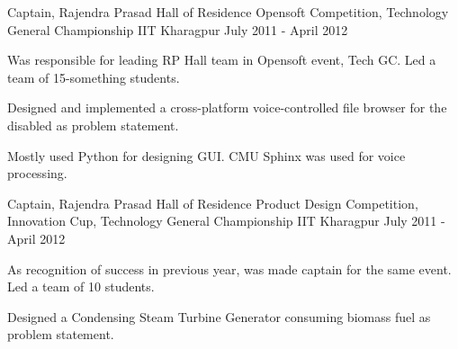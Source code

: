 \begin{cventries}
  \cventry
    {Captain, Rajendra Prasad Hall of Residence} %
    {Opensoft Competition, Technology General Championship} %
    {IIT Kharagpur} %
    {July 2011 - April 2012} %
    {
      \begin{cvitems} %
        \item {Was responsible for leading RP Hall team in Opensoft event, Tech GC. Led a team of 15-something students.}
        \item {Designed and implemented a cross-platform voice-controlled file browser for the disabled as problem statement.}
        \item {Mostly used Python for designing GUI. CMU Sphinx was used for voice processing.}
      \end{cvitems}
    }

  \cventry
    {Captain, Rajendra Prasad Hall of Residence} %
    {Product Design Competition, Innovation Cup, Technology General Championship} %
    {IIT Kharagpur} %
    {July 2011 - April 2012} %
    {
      \begin{cvitems} %
        \item {As recognition of success in previous year, was made captain for the same event. Led a team of 10 students.}
        \item {Designed a Condensing Steam Turbine Generator consuming biomass fuel as problem statement.}
      \end{cvitems}
    }

\end{cventries}

